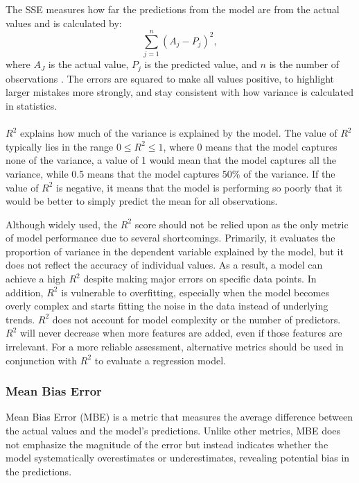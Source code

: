 \noindent The SSE measures how far the predictions from the model are from the actual values and is calculated by:
\begin{equation}
	\sum_{j=1}^{n}(A_j - P_j)^2,
\end{equation}
where $A_J$ is the actual value, $P_j$ is the predicted value, and $n$ is the number of observations \cite{metrics}. The errors are squared to make all values positive, to highlight larger mistakes more strongly, and stay consistent with how variance is calculated in statistics.
\\\\
$R^2$ explains how much of the variance is explained by the model. The value of $R^2$ typically lies in the range $0 \leq R^2 \leq 1$, where 0 means that the model captures none of the variance, a value of 1 would mean that the model captures all the variance, while 0.5 means that the model captures 50\% of the variance. If the value of $R^2$ is negative, it means that the model is performing so poorly that it would be better to simply predict the mean for all observations.

\noindent Although widely used, the $R^2$ score should not be relied upon as the only metric of model performance due to several shortcomings. Primarily, it evaluates the proportion of variance in the dependent variable explained by the model, but it does not reflect the accuracy of individual values. As a result, a model can achieve a high $R^2$ despite making major errors on specific data points. In addition, $R^2$ is vulnerable to overfitting, especially when the model becomes overly complex and starts fitting the noise in the data instead of underlying trends. $R^2$ does not account for model complexity or the number of predictors. $R^2$ will never decrease when more features are added, even if those features are irrelevant. For a more reliable assessment, alternative metrics should be used in conjunction with $R^2$ to evaluate a regression model. 
\newpage

\subsubsection{Mean Bias Error}
Mean Bias Error (MBE) is a metric that measures the average difference between the actual values and the model's predictions. Unlike other metrics, MBE does not emphasize the magnitude of the error but instead indicates whether the model systematically overestimates or underestimates, revealing potential bias in the predictions. \newline 

